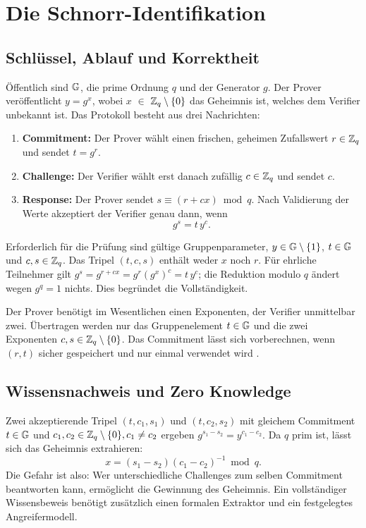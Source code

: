 \section{Die Schnorr-Identifikation}\label{sec:protokoll}
\subsection{Schlüssel, Ablauf und Korrektheit}
Öffentlich sind $\mathbb{G}$, die prime Ordnung $q$ und der Generator $g$. 
Der Prover veröffentlicht $y=g^x$, wobei $x$ $\in$ $\mathbb{Z}_q\setminus\{0\}$ das Geheimnis ist, welches dem Verifier unbekannt ist. 
Das Protokoll besteht aus drei Nachrichten:
\begin{enumerate}
\item \textbf{Commitment:} Der Prover wählt einen frischen, geheimen Zufallswert $r\in\mathbb{Z}_q$ und sendet $t=g^r$.
\item \textbf{Challenge:} Der Verifier wählt erst danach zufällig $c\in\mathbb{Z}_q$ und sendet $c$.
\item \textbf{Response:} Der Prover sendet $s\equiv(r+cx)\bmod q$. Nach Validierung der Werte akzeptiert der Verifier genau dann, wenn
\begin{equation}\label{eq:pruefung}
 g^s=t\,y^c.
\end{equation}
\end{enumerate}
Erforderlich für die Prüfung sind gültige Gruppenparameter, 
$y\in\mathbb{G}\setminus\{1\}$, $t\in\mathbb{G}$ und $c,s\in\mathbb{Z}_q$. Das Tripel $(t,c,s)$ enthält weder $x$ noch $r$. 
Für ehrliche Teilnehmer gilt $g^s=g^{r+cx}=g^r(g^x)^c=t\,y^c$; die Reduktion modulo $q$ ändert wegen $g^q=1$ nichts. Dies begründet die Vollständigkeit.

Der Prover benötigt im Wesentlichen einen Exponenten, der Verifier unmittelbar zwei. 
Übertragen werden nur das Gruppenelement $t \in \mathbb{G}$ und die zwei Exponenten $c, s \in \mathbb{Z}_q\setminus\{0\}$. 
Das Commitment lässt sich vorberechnen, wenn $(r,t)$ sicher gespeichert und nur einmal verwendet wird \cite{schnorr1991}.

\clearpage
\subsection{Wissensnachweis und Zero Knowledge}
Zwei akzeptierende Tripel $(t,c_1,s_1)$ und $(t,c_2,s_2)$ mit gleichem Commitment $t \in \mathbb{G}$ und $c_1,c_2 \in \mathbb{Z}_q\setminus\{0\}, c_1\neq c_2$ ergeben $g^{s_1-s_2}=y^{c_1-c_2}$. Da $q$ prim ist, lässt sich das Geheimnis extrahieren:
\begin{equation}\label{eq:extraktion}
 x=(s_1-s_2)(c_1-c_2)^{-1}\bmod q.
\end{equation}
Die Gefahr ist also: Wer unterschiedliche Challenges zum selben Commitment beantworten kann, ermöglicht die Gewinnung des Geheimnis. 
Ein vollständiger Wissensbeweis benötigt zusätzlich einen formalen Extraktor und ein festgelegtes Angreifermodell.

